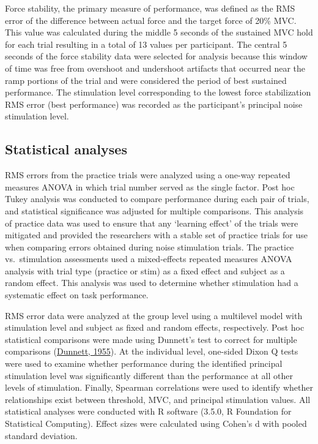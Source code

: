 \documentclass[]{cik}%
\begin{document}
Force stability, the primary measure of performance, was defined as the
RMS error of the difference between actual force and the target force of
20\% MVC. This value was calculated during the middle 5 seconds of the
sustained MVC hold for each trial resulting in a total of 13 values per
participant. The central 5 seconds of the force stability data were
selected for analysis because this window of time was free from
overshoot and undershoot artifacts that occurred near the ramp portions
of the trial and were considered the period of best sustained
performance. The stimulation level corresponding to the lowest force
stabilization RMS error (best performance) was recorded as the
participant's principal noise stimulation level.

\hypertarget{statistical-analyses}{%
\subsection{Statistical analyses}\label{statistical-analyses}}

RMS errors from the practice trials were analyzed using a one-way
repeated measures ANOVA in which trial number served as the single
factor. Post hoc Tukey analysis was conducted to compare performance
during each pair of trials, and statistical significance was adjusted
for multiple comparisons. This analysis of practice data was used to
ensure that any `learning effect' of the trials were mitigated and
provided the researchers with a stable set of practice trials for use
when comparing errors obtained during noise stimulation trials. The
practice vs.~stimulation assessments used a mixed-effects repeated
measures ANOVA analysis with trial type (practice or stim) as a fixed
effect and subject as a random effect. This analysis was used to
determine whether stimulation had a systematic effect on task
performance.

RMS error data were analyzed at the group level using a multilevel model
with stimulation level and subject as fixed and random effects,
respectively. Post hoc statistical comparisons were made using Dunnett's
test to correct for multiple comparisons
(\protect\hyperlink{ref-dunnett1955}{Dunnett, 1955}). At the individual
level, one-sided Dixon Q tests were used to examine whether performance
during the identified principal stimulation level was significantly
different than the performance at all other levels of stimulation.
Finally, Spearman correlations were used to identify whether
relationships exist between threshold, MVC, and principal stimulation
values. All statistical analyses were conducted with R software (3.5.0,
R Foundation for Statistical Computing). Effect sizes were calculated
using Cohen's d with pooled standard deviation.
\end{document}
